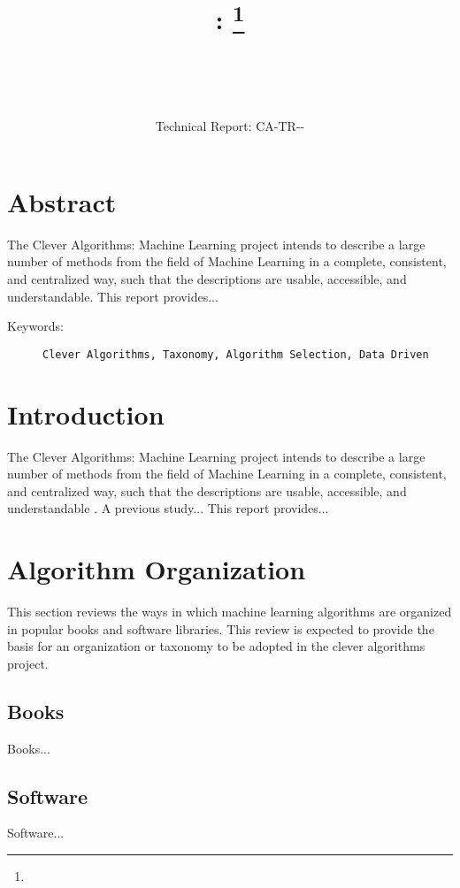 \documentclass[a4paper, 11pt]{article}
\title{{\myreporttitle}: {\myreportsubtitle}\footnote{\myreportlicense}}
\author{\myreportauthor\\{\myreportemail}\\\small\myreportproject}
\date{\myreportfulldate\\{\small{Technical Report: CA-TR-{\myreportdate}-\myreportversion}}}
\begin{document}
\maketitle

\section*{Abstract} 
The Clever Algorithms: Machine Learning project intends to describe a large number of methods from the field of Machine Learning in a complete, consistent, and centralized way, such that the descriptions are usable, accessible, and understandable.
This report provides...


\begin{description}
	\item[Keywords:] {\small\texttt{Clever Algorithms, Taxonomy, Algorithm Selection, Data Driven}}
\end{description} 

\section{Introduction}
\label{sec:introduction}
The Clever Algorithms: Machine Learning project intends to describe a large number of methods from the field of Machine Learning in a complete, consistent, and centralized way, such that the descriptions are usable, accessible, and understandable \cite{Brownlee2011a}.
A previous study...
This report provides...

%
%
\section{Algorithm Organization}
\label{sec:organization}
This section reviews the ways in which machine learning algorithms are organized in popular books and software libraries. This review is expected to provide the basis for an organization or taxonomy to be adopted in the clever algorithms project.

\subsection{Books}
Books...


\subsection{Software}
Software...
\end{document}
